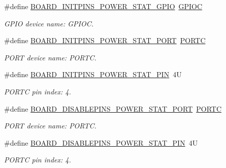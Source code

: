 \begin{DoxyCompactItemize}
\item 
\mbox{\label{group__pin__mux_ga007ddacf2b697c747453b4de32e639ce}} 
\#define \mbox{\hyperlink{group__pin__mux_ga007ddacf2b697c747453b4de32e639ce}{B\+O\+A\+R\+D\+\_\+\+I\+N\+I\+T\+P\+I\+N\+S\+\_\+\+P\+O\+W\+E\+R\+\_\+\+S\+T\+A\+T\+\_\+\+G\+P\+IO}}~\mbox{\hyperlink{group___g_p_i_o___peripheral___access___layer_ga2dca03332d620196ba943bc2346eaa08}{G\+P\+I\+OC}}
\begin{DoxyCompactList}\small\item\em G\+P\+IO device name\+: G\+P\+I\+OC. \end{DoxyCompactList}\item 
\mbox{\label{group__pin__mux_ga13c890578eac55359893483b6894c18d}} 
\#define \mbox{\hyperlink{group__pin__mux_ga13c890578eac55359893483b6894c18d}{B\+O\+A\+R\+D\+\_\+\+I\+N\+I\+T\+P\+I\+N\+S\+\_\+\+P\+O\+W\+E\+R\+\_\+\+S\+T\+A\+T\+\_\+\+P\+O\+RT}}~\mbox{\hyperlink{group___p_o_r_t___peripheral___access___layer_ga68fea88642279a70246e026e7221b0a5}{P\+O\+R\+TC}}
\begin{DoxyCompactList}\small\item\em P\+O\+RT device name\+: P\+O\+R\+TC. \end{DoxyCompactList}\item 
\mbox{\label{group__pin__mux_ga7051894964869d27de3d38839ae1b765}} 
\#define \mbox{\hyperlink{group__pin__mux_ga7051894964869d27de3d38839ae1b765}{B\+O\+A\+R\+D\+\_\+\+I\+N\+I\+T\+P\+I\+N\+S\+\_\+\+P\+O\+W\+E\+R\+\_\+\+S\+T\+A\+T\+\_\+\+P\+IN}}~4U
\begin{DoxyCompactList}\small\item\em P\+O\+R\+TC pin index\+: 4. \end{DoxyCompactList}\item 
\mbox{\label{group__pin__mux_ga49f088d9181bf90858b7451445a6c42b}} 
\#define \mbox{\hyperlink{group__pin__mux_ga49f088d9181bf90858b7451445a6c42b}{B\+O\+A\+R\+D\+\_\+\+D\+I\+S\+A\+B\+L\+E\+P\+I\+N\+S\+\_\+\+P\+O\+W\+E\+R\+\_\+\+S\+T\+A\+T\+\_\+\+P\+O\+RT}}~\mbox{\hyperlink{group___p_o_r_t___peripheral___access___layer_ga68fea88642279a70246e026e7221b0a5}{P\+O\+R\+TC}}
\begin{DoxyCompactList}\small\item\em P\+O\+RT device name\+: P\+O\+R\+TC. \end{DoxyCompactList}\item 
\mbox{\label{group__pin__mux_ga3374e4c8de8af5abc0769e170dac25aa}} 
\#define \mbox{\hyperlink{group__pin__mux_ga3374e4c8de8af5abc0769e170dac25aa}{B\+O\+A\+R\+D\+\_\+\+D\+I\+S\+A\+B\+L\+E\+P\+I\+N\+S\+\_\+\+P\+O\+W\+E\+R\+\_\+\+S\+T\+A\+T\+\_\+\+P\+IN}}~4U
\begin{DoxyCompactList}\small\item\em P\+O\+R\+TC pin index\+: 4. \end{DoxyCompactList}\end{DoxyCompactItemize}

